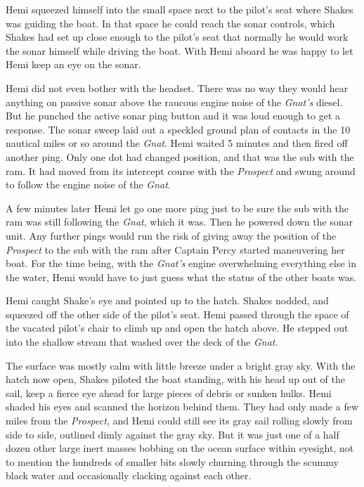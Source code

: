 \documentclass[
]{scrbook}
\begin{document}
Hemi squeezed himself into the small space next to the pilot's seat
where Shakes was guiding the boat. In that space he could reach the
sonar controls, which Shakes had set up close enough to the pilot's seat
that normally he would work the sonar himself while driving the boat.
With Hemi aboard he was happy to let Hemi keep an eye on the sonar.

Hemi did not even bother with the headset. There was no way they would
hear anything on passive sonar above the raucous engine noise of the
\emph{Gnat's} diesel. But he punched the active sonar ping button and it
was loud enough to get a response. The sonar sweep laid out a speckled
ground plan of contacts in the 10 nautical miles or so around the
\emph{Gnat}. Hemi waited 5 minutes and then fired off another ping. Only
one dot had changed position, and that was the sub with the ram. It had
moved from its intercept course with the \emph{Prospect} and swung
around to follow the engine noise of the \emph{Gnat}.

A few minutes later Hemi let go one more ping just to be sure the sub
with the ram was still following the \emph{Gnat}, which it was. Then he
powered down the sonar unit. Any further pings would run the risk of
giving away the position of the \emph{Prospect} to the sub with the ram
after Captain Percy started maneuvering her boat. For the time being,
with the \emph{Gnat's} engine overwhelming everything else in the water,
Hemi would have to just guess what the status of the other boats was.

Hemi caught Shake's eye and pointed up to the hatch. Shakes nodded, and
squeezed off the other side of the pilot's seat. Hemi passed through the
space of the vacated pilot's chair to climb up and open the hatch above.
He stepped out into the shallow stream that washed over the deck of the
\emph{Gnat}.

The surface was mostly calm with little breeze under a bright gray sky.
With the hatch now open, Shakes piloted the boat standing, with his head
up out of the sail, keep a fierce eye ahead for large pieces of debris
or sunken hulks. Hemi shaded his eyes and scanned the horizon behind
them. They had only made a few miles from the \emph{Prospect}, and Hemi
could still see its gray sail rolling slowly from side to side, outlined
dimly against the gray sky. But it was just one of a half dozen other
large inert masses bobbing on the ocean surface within eyesight, not to
mention the hundreds of smaller bits slowly churning through the scummy
black water and occasionally clacking against each other.
\end{document}
